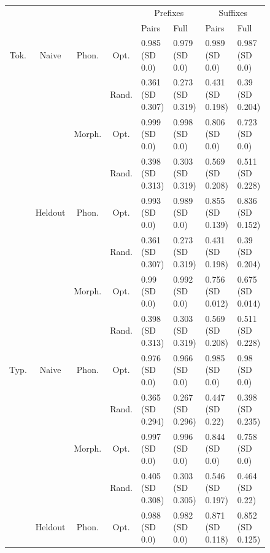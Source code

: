 \documentclass[11pt,letterpaper]{article}
\begin{document}



\begin{figure}
\begin{tabular}{cccc||ll|ll}
	&& &              & \multicolumn{2}{c}{Prefixes}    & \multicolumn{2}{|c}{Suffixes} \\
	  &&   &              & Pairs & Full & Pairs & Full \\ \hline\hline
Tok. & Naive & Phon. &   Opt.  &  0.985 (SD 0.0) & 0.979 (SD 0.0) & 0.989 (SD 0.0) & 0.987 (SD 0.0) \\
     &       &       &   Rand. &  0.361 (SD 0.307) & 0.273 (SD 0.319) & 0.431 (SD 0.198) & 0.39 (SD 0.204) \\
     &       & Morph.&   Opt.  &  0.999 (SD 0.0) & 0.998 (SD 0.0) & 0.806 (SD 0.0) & 0.723 (SD 0.0) \\
     &       &       &   Rand.  &  0.398 (SD 0.313) & 0.303 (SD 0.319) & 0.569 (SD 0.208) & 0.511 (SD 0.228) \\ \hline
     & Heldout & Phon.   &   Opt.  &  0.993 (SD 0.0) & 0.989 (SD 0.0) & 0.855 (SD 0.139) & 0.836 (SD 0.152) \\
     &         &         &   Rand.  &  0.361 (SD 0.307) & 0.273 (SD 0.319) & 0.431 (SD 0.198) & 0.39 (SD 0.204) \\
     &          & Morph. &   Opt.  &  0.99 (SD 0.0) & 0.992 (SD 0.0) & 0.756 (SD 0.012) & 0.675 (SD 0.014) \\
     &          &        &   Rand.  &  0.398 (SD 0.313) & 0.303 (SD 0.319) & 0.569 (SD 0.208) & 0.511 (SD 0.228) \\ \hline \hline
Typ. & Naive   & Phon. &   Opt.&  0.976 (SD 0.0) & 0.966 (SD 0.0) & 0.985 (SD 0.0) & 0.98 (SD 0.0) \\
     &       &       &  Rand.  &  0.365 (SD 0.294) & 0.267 (SD 0.296) & 0.447 (SD 0.22) & 0.398 (SD 0.235) \\
     &       & Morph.&   Opt.  &  0.997 (SD 0.0) & 0.996 (SD 0.0) & 0.844 (SD 0.0) & 0.758 (SD 0.0) \\
     &       &       &   Rand.  &  0.405 (SD 0.308) & 0.303 (SD 0.305) & 0.546 (SD 0.197) & 0.464 (SD 0.22) \\ \hline
     &Heldout  & Phon.   &   Opt.  &  0.988 (SD 0.0) & 0.982 (SD 0.0) & 0.871 (SD 0.118) & 0.852 (SD 0.125) \\

\end{tabular}
\end{figure}
\end{document}
